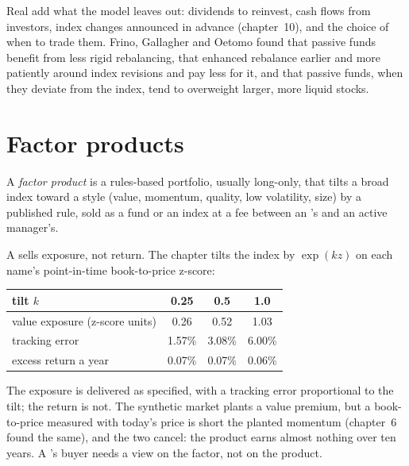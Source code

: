 Real  add what the model leaves out: dividends to reinvest, cash flows from investors, index changes announced in advance (chapter~10), and
the choice of when to trade them. Frino, Gallagher and Oetomo found that passive funds benefit from less rigid rebalancing, that enhanced 
rebalance earlier and more patiently around index revisions and pay less for it, and that passive funds, when they deviate from the index, tend to
overweight larger, more liquid stocks.

\section{Factor products}

\begin{definition}\label{def:s1:the-asset-managers-strategies:factor}
A \emph{factor product} is a rules-based portfolio, usually long-only, that tilts a broad index toward a style (value, momentum,
quality, low volatility, size) by a published rule, sold as a fund or an index at a fee between an 's and an active manager's.
\end{definition}

A  sells exposure, not return. The chapter tilts the index by $\exp(kz)$ on each name's point-in-time book-to-price z-score:

\begin{center}
\small
\begin{tabular}{@{}lccc@{}}
\toprule
tilt $k$ & 0.25 & 0.5 & 1.0\\
\midrule
value exposure (z-score units) & 0.26 & 0.52 & 1.03\\
tracking error & 1.57\% & 3.08\% & 6.00\%\\
excess return a year & 0.07\% & 0.07\% & 0.06\%\\
\bottomrule
\end{tabular}
\end{center}

The exposure is delivered as specified, with a tracking error proportional to the tilt; the return is not. The synthetic market plants a value premium,
but a book-to-price measured with today's price is short the planted momentum (chapter~6 found the same), and the two cancel: the product earns almost
nothing over ten years. A 's buyer needs a view on the factor, not on the product.

